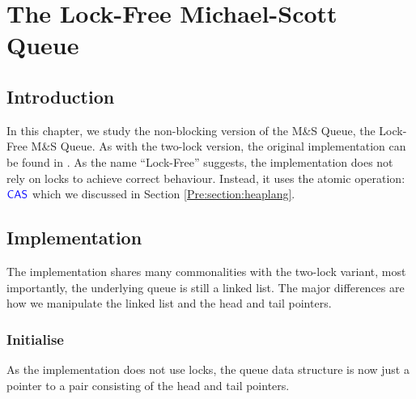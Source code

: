 \documentclass[a4paper, 10pt]{report}
\theoremstyle{definition}
\newcommand{\msq}{M\&S Queue}
\newcommand{\lfmsq}{Lock-Free \msq{}}
\begin{document}
\chapter{The Lock-Free Michael-Scott Queue}
\label{ch:LFMSQ}

\section{Introduction}
\label{LFMSQ:section:introduction}

In this chapter, we study the non-blocking version of the \msq{}, the \lfmsq{}. As with the two-lock version, the original implementation can be found in \citet{DBLP:conf/podc/MichaelS96}. As the name ``Lock-Free'' suggests, the implementation does not rely on locks to achieve correct behaviour. Instead, it uses the atomic operation: $\textsf{\color{blue} CAS}$ which we discussed in Section \ref{Pre:section:heaplang}.

\section{Implementation}
\label{LFMSQ:section:implementation}

The implementation shares many commonalities with the two-lock variant, most importantly, the underlying queue is still a linked list. The major differences are how we manipulate the linked list and the head and tail pointers.

\subsection{Initialise}
As the implementation does not use locks, the queue data structure is now just a pointer to a pair consisting of the head and tail pointers.
\end{document}
